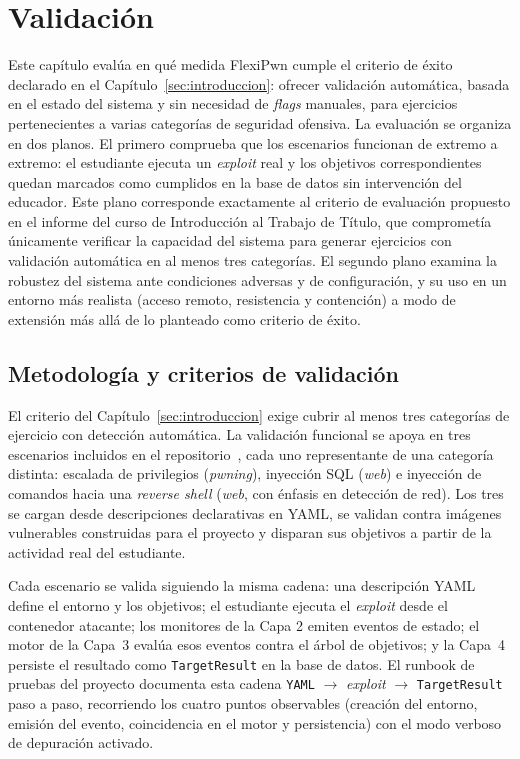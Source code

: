 \chapter{Validación}
\label{sec:validacion}

Este capítulo evalúa en qué medida FlexiPwn cumple el criterio de éxito
declarado en el Capítulo~\ref{sec:introduccion}: ofrecer validación automática,
basada en el estado del sistema y sin necesidad de \textit{flags} manuales, para
ejercicios pertenecientes a varias categorías de seguridad ofensiva. La
evaluación se organiza en dos planos. El primero comprueba que los escenarios
funcionan de extremo a extremo: el estudiante ejecuta un \textit{exploit} real y
los objetivos correspondientes quedan marcados como cumplidos en la base de
datos sin intervención del educador. Este plano corresponde exactamente al
criterio de evaluación propuesto en el informe del curso de Introducción al
Trabajo de Título, que comprometía únicamente verificar la capacidad del sistema
para generar ejercicios con validación automática en al menos tres categorías.
El segundo plano examina la robustez del sistema ante condiciones adversas y de
configuración, y su uso en un entorno más realista (acceso remoto, resistencia y
contención) a modo de extensión más allá de lo planteado como criterio de éxito.

\section{Metodología y criterios de validación}
\label{sec:metodologia-validacion}

El criterio del Capítulo~\ref{sec:introduccion} exige cubrir al menos tres
categorías de ejercicio con detección automática. La validación funcional se
apoya en tres escenarios incluidos en el repositorio~\cite{flexipwn}, cada uno
representante de una categoría distinta: escalada de privilegios
(\textit{pwning}), inyección SQL (\textit{web}) e inyección de comandos hacia
una \textit{reverse shell} (\textit{web}, con énfasis en detección de red). Los
tres se cargan desde descripciones declarativas en YAML, se validan contra
imágenes vulnerables construidas para el proyecto y disparan sus objetivos a
partir de la actividad real del estudiante.

Cada escenario se valida siguiendo la misma cadena: una descripción YAML define
el entorno y los objetivos; el estudiante ejecuta el \textit{exploit} desde el
contenedor atacante; los monitores de la Capa 2 emiten eventos de estado; el
motor de la Capa~3 evalúa esos eventos contra el árbol de objetivos; y la Capa~4
persiste el resultado como \texttt{TargetResult} en la base de datos. El runbook
de pruebas del proyecto documenta esta cadena \texttt{YAML} $\rightarrow$
\textit{exploit} $\rightarrow$ \texttt{TargetResult} paso a paso, recorriendo
los cuatro puntos observables (creación del entorno, emisión del evento,
coincidencia en el motor y persistencia) con el modo verboso de depuración
activado.

